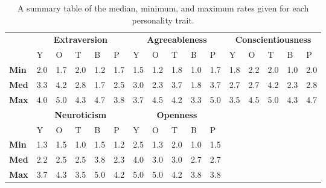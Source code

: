 \begin{table}[hbt!]
    \renewcommand{\arraystretch}{1}
    \begin{center}
        \begin{tabular}{p{}|
        p{}|p{}|p{}|p{}|p{}||
        p{}|p{}|p{}|p{}|p{}||
        p{}|p{}|p{}|p{}|p{}|}
            \cline{2-16}
            & \multicolumn{5}{c||}{\textbf{Extraversion}} & \multicolumn{5}{c||}{\textbf{Agreeableness}}
            & \multicolumn{5}{c|}{\textbf{Conscientiousness}} \\
            \cline{2-16}
            & Y & O & T & B & P & Y & O & T & B & P & Y & O & T & B & P     \\
            \cline{2-16}
            \textbf{Min}    & 2.0 & 1.7 & 2.0 & 1.2 & 1.7 & 1.5 & 1.2 & 1.8 & 1.0 & 1.7 & 1.8 & 2.2 & 2.0 & 1.0 & 2.0  \\
            \textbf{Med}    & 3.3 & 4.2 & 2.8 & 1.7 & 2.5 & 3.0 & 2.3 & 3.7 & 1.8 & 3.7 & 2.7 & 2.7 & 4.2 & 2.3 & 2.8  \\
            \textbf{Max}    & 4.0 & 5.0 & 4.3 & 4.7 & 3.8 & 3.7 & 4.5 & 4.2 & 3.3 & 5.0 & 3.5 & 4.5 & 5.0 & 4.3 & 4.7 \\
            \cline{2-16}
            \cline{2-11}
            &  \multicolumn{5}{|c||}{\textbf{Neuroticism}} & \multicolumn{5}{|c||}{\textbf{Openness}} \\
            \cline{2-11}
            & Y & O & T & B & P & Y & O & T & B & P            \\
            \cline{2-11}
            \textbf{Min}    & 1.3 & 1.5 & 1.0 & 1.5 & 1.2 & 2.5 & 1.3 & 2.0 & 1.0 & 1.5    \\
            \textbf{Med}    & 2.2 & 2.5 & 2.5 & 3.8 & 2.3 & 4.0 & 3.0 & 3.0 & 2.7 & 2.7    \\
            \textbf{Max}    & 3.7 & 4.3 & 3.5 & 5.0 & 4.2 & 5.0 & 5.0 & 4.2 & 3.8 & 3.8    \\
            \cline{2-11}
        \end{tabular}
        \caption{A summary table of the median, minimum, and maximum rates given for each personality trait.}
        \label{table:medianMT1}
    \end{center}
\end{table}

